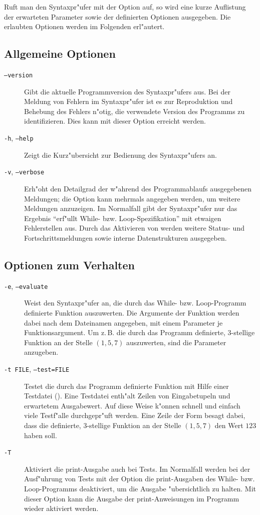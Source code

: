 \documentclass[a4paper,ngerman]{article}
\newcommand{\zB}{z.\,B.}
\begin{document}
Ruft man den Syntaxpr"ufer mit der Option  auf, so wird eine
kurze Auflistung der erwarteten Parameter sowie der definierten Optionen
ausgegeben. Die erlaubten Optionen werden im Folgenden erl"autert.
\subsection{Allgemeine Optionen}
\begin{description}
\item[\texttt{--version}] Gibt die aktuelle Programmversion des
  Syntaxpr"ufers aus. Bei der Meldung von Fehlern im Syntaxpr"ufer ist
  es zur Reproduktion und Behebung des Fehlers n"otig, die verwendete
  Version des Programms zu identifizieren. Dies kann mit dieser Option
  erreicht werden.
\item[\texttt{-h}, \texttt{--help}] Zeigt die Kurz"ubersicht zur
  Bedienung des Syntaxpr"ufers an.
\item[\texttt{-v}, \texttt{--verbose}] Erh"oht den Detailgrad der
  w"ahrend des Programmablaufs ausgegebenen Meldungen; die Option kann
  mehrmals angegeben werden, um weitere Meldungen anzuzeigen. Im
  Normalfall gibt der Syntaxpr"ufer nur das Ergebnis "`erf"ullt While-
  bzw. Loop-Spezifikation"' mit etwaigen Fehlerstellen aus. Durch das
  Aktivieren von  werden weitere Status- und
  Fortschrittsmeldungen sowie interne Datenstrukturen ausgegeben.
\end{description}
\subsection{Optionen zum Verhalten}
\begin{description}
\item[\texttt{-e}, \texttt{--evaluate}] Weist den Syntaxpr"ufer an,
  die durch das While- bzw. Loop-Programm definierte Funktion
  auszuwerten. Die Argumente der Funktion werden dabei nach dem
  Dateinamen angegeben, mit einem Parameter je Funktionsargument. Um
  \zB{} die durch das Programm  definierte, 3-stellige
  Funktion an der Stelle $(1, 5, 7)$ auszuwerten, sind die Parameter
   anzugeben.
\item[\texttt{-t FILE}, \texttt{--test=FILE}] Testet die durch das
  Programm definierte Funktion mit Hilfe einer Testdatei
  (). Eine Testdatei enth"alt Zeilen von Eingabetupeln und
  erwartetem Ausgabewert. Auf diese Weise k"onnen schnell und einfach
  viele Testf"alle durchgepr"uft werden. Eine Zeile der Form  besagt dabei, dass die definierte, 3-stellige Funktion an der
  Stelle $(1, 5, 7)$ den Wert $123$ haben soll.
\item[\texttt{-T}] Aktiviert die print-Ausgabe auch bei Tests. Im
  Normalfall werden bei der Ausf"uhrung von Tests mit der Option
   die print-Ausgaben des While- bzw. Loop-Programms
  deaktiviert, um die Ausgabe "ubersichtlich zu halten. Mit dieser
  Option kann die Ausgabe der print-Anweisungen im Programm wieder
  aktiviert werden.
\end{description}
\end{document}
